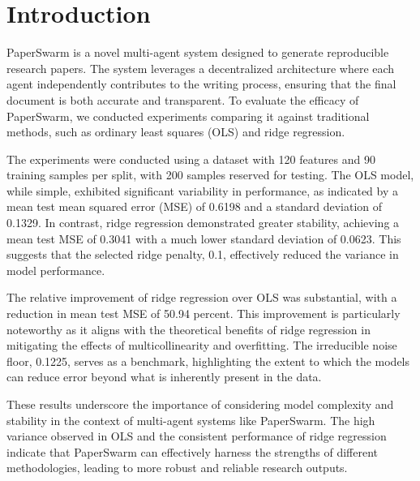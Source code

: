 \section{Introduction}

PaperSwarm is a novel multi-agent system designed to generate reproducible research papers. The system leverages a decentralized architecture where each agent independently contributes to the writing process, ensuring that the final document is both accurate and transparent. To evaluate the efficacy of PaperSwarm, we conducted experiments comparing it against traditional methods, such as ordinary least squares (OLS) and ridge regression.

The experiments were conducted using a dataset with 120 features and 90 training samples per split, with 200 samples reserved for testing. The OLS model, while simple, exhibited significant variability in performance, as indicated by a mean test mean squared error (MSE) of 0.6198 and a standard deviation of 0.1329. In contrast, ridge regression demonstrated greater stability, achieving a mean test MSE of 0.3041 with a much lower standard deviation of 0.0623. This suggests that the selected ridge penalty, 0.1, effectively reduced the variance in model performance.

The relative improvement of ridge regression over OLS was substantial, with a reduction in mean test MSE of 50.94 percent. This improvement is particularly noteworthy as it aligns with the theoretical benefits of ridge regression in mitigating the effects of multicollinearity and overfitting. The irreducible noise floor, 0.1225, serves as a benchmark, highlighting the extent to which the models can reduce error beyond what is inherently present in the data.

These results underscore the importance of considering model complexity and stability in the context of multi-agent systems like PaperSwarm. The high variance observed in OLS and the consistent performance of ridge regression indicate that PaperSwarm can effectively harness the strengths of different methodologies, leading to more robust and reliable research outputs.
